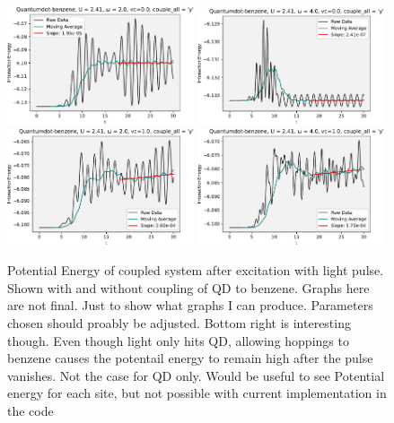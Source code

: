 \begin{figure}[!hbt]
    \centering
    \includegraphics[width=0.49\textwidth]{graph/potential_energy/Epot_w2_vc0.pdf}
    \includegraphics[width=0.49\textwidth]{graph/potential_energy/Epot_w4_vc0.pdf}
    \includegraphics[width=0.49\textwidth]{graph/potential_energy/Epot_w2_vc1.pdf}
    \includegraphics[width=0.49\textwidth]{graph/potential_energy/Epot_w4_vc1.pdf}
    \caption{Potential Energy of coupled system after excitation with light pulse. Shown with and without coupling of QD to benzene. {\color{red} Graphs here are not final. Just to show what graphs I can produce. Parameters chosen should proably be adjusted. Bottom right is interesting though. Even though light only hits QD, allowing hoppings to benzene causes the potentail energy to remain high after the pulse vanishes. Not the case for QD only. Would be useful to see Potential energy for each site, but not possible with current implementation in the code}}
    \label{fig:potential_energy}
\end{figure}